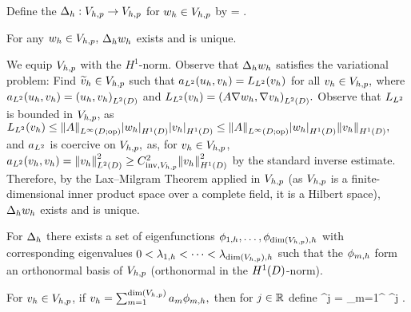Define the  $\Delta_{h}:V_{h,p}\rightarrow V_{h,p}$ for $w_{h} \in V_{h,p}$ by
\beq\label{eq:discderdef}
\IPLtD{\Deltah \wh}{\vh} =  \tforall \vh \in \Vhp.
\eeq
\ede

\label{lem:ddwd}
For any $w_{h} \in V_{h,p},$ $\Delta_{h} w_{h}$ exists and is unique.
\ele

We equip $V_{h,p}$ with the $H^1$-norm. Observe that $\Delta_{h} w_{h}$ satisfies the variational problem: Find $\widetilde{v}_{h}  \in V_{h,p}$ such that $a_{L^{2}}(u_{h},v_{h}) = L_{L^{2}}(v_{h})$ for all $v_{h} \in V_{h,p},$ where $\add(\uh,\vh) = \IPLtD{\uh}{\vh}$ and $\Ldd(\vh) = \IPLtD{A \grad \wh}{\grad \vh}.$ Observe that $L_{L^{2}}$ is bounded in $V_{h,p}$, as $\Ldd(\vh) \leq \NLiDop{A} \SNHoD{\wh}\SNHoD{\vh} \leq \NLiDop{A} \SNHoD{\wh}\NHoD{\vh},$ and $a_{L^{2}}$ is coercive on $V_{h,p},$ as, for $v_{h} \in V_{h,p}$, $\add(\vh,\vh) = \NLtD{\vh}^2 \geq \CinvVhp^2 \NHoD{\vh}^2$ by the standard inverse estimate. Therefore, by the Lax--Milgram Theorem applied in $V_{h,p}$ (as $V_{h,p}$ is a finite-dimensional inner product space over a complete field, it is a Hilbert space), $\Delta_{h} w_{h}$ exists and is unique.
\epf


For $\Delta_{h}$ there exists a set of eigenfunctions $\phioh,\ldots,\phidimVhph$  with corresponding eigenvalues $0 < \lambdaoh < \cdots < \lambdadimVhph$ such that the $\phi_{m,h}$ form an orthonormal basis of $V_{h,p}$ (orthonormal in the $\HoD$-norm).

For $v_{h} \in V_{h,p}$, if $\vh = \sum_{m=1}^{\dimVhp} \am \phimh,$ then for $j \in \mathbb R$ define
\beqs
\Deltah^j \vh = \sum_{m=1}^{\dimVhp} \lambdamh^j \am \phimh.
\eeqs

\ede

